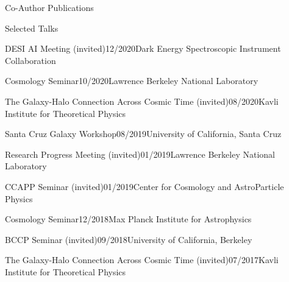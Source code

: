\documentclass{resume}
\begin{document}
\begin{rSection}{Co-Author Publications}
  \setlength{\leftskip}{0.5cm}
  \nocite{Wang2020_MNRAS_498_4450, vandenBosch2019_MNRAS_488_4984, Wang2019_MNRAS_488_3541, Zentner2019_MNRAS_485_1196, Villarreal2017_MNRAS_472_1088, Campbell2018_MNRAS_477_359, Momcheva2016_ApJS_225_27, Nelson2016_ApJ_828_27}
  \printbibliography[heading=none]
\end{rSection}

\newpage

\begin{rSection}{Selected Talks}
  \begin{adjustwidth}{0.5cm}{}
  
    \begin{rSubsection}{DESI AI Meeting (invited)}{12/2020}{Dark Energy Spectroscopic Instrument Collaboration}{}\end{rSubsection}
  
    \begin{rSubsection}{Cosmology Seminar}{10/2020}{Lawrence Berkeley National Laboratory}{}\end{rSubsection}

    \begin{rSubsection}{The Galaxy-Halo Connection Across Cosmic Time (invited)}{08/2020}{Kavli Institute for Theoretical Physics}{}\end{rSubsection}

    \begin{rSubsection}{Santa Cruz Galaxy Workshop}{08/2019}{University of California, Santa Cruz}{}\end{rSubsection}

    \begin{rSubsection}{Research Progress Meeting (invited)}{01/2019}{Lawrence Berkeley National Laboratory}{}\end{rSubsection}

    \begin{rSubsection}{CCAPP Seminar (invited)}{01/2019}{Center for Cosmology and AstroParticle Physics}{}\end{rSubsection}

    \begin{rSubsection}{Cosmology Seminar}{12/2018}{Max Planck Institute for Astrophysics}{}\end{rSubsection}

    \begin{rSubsection}{BCCP Seminar (invited)}{09/2018}{University of California, Berkeley}{}\end{rSubsection}

    \begin{rSubsection}{The Galaxy-Halo Connection Across Cosmic Time (invited)}{07/2017}{Kavli Institute for Theoretical Physics}{}\end{rSubsection}

  \end{adjustwidth}
\end{rSection}
\end{document}
